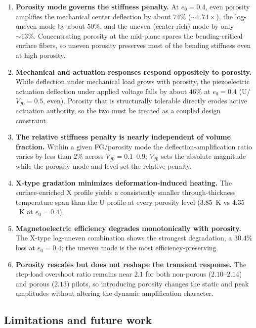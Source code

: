 \documentclass[11pt,a4paper]{article}
\begin{document}
\begin{enumerate}[leftmargin=2em]
\item \textbf{Porosity mode governs the stiffness penalty.} At $e_0 = 0.4$, even porosity amplifies the mechanical center deflection by about $74\%$ ($\sim1.74\times$), the log-uneven mode by about $50\%$, and the uneven (center-rich) mode by only $\sim13\%$. Concentrating porosity at the mid-plane spares the bending-critical surface fibers, so uneven porosity preserves most of the bending stiffness even at high porosity.

\item \textbf{Mechanical and actuation responses respond oppositely to porosity.} While deflection under mechanical load grows with porosity, the piezoelectric actuation deflection under applied voltage falls by about $46\%$ at $e_0=0.4$ (U/$V_{f0}=0.5$, even). Porosity that is structurally tolerable directly erodes active actuation authority, so the two must be treated as a coupled design constraint.

\item \textbf{The relative stiffness penalty is nearly independent of volume fraction.} Within a given FG/porosity mode the deflection-amplification ratio varies by less than $2\%$ across $V_{f0}=0.1$--$0.9$; $V_{f0}$ sets the absolute magnitude while the porosity mode and level set the relative penalty.

\item \textbf{X-type gradation minimizes deformation-induced heating.} The surface-enriched X profile yields a consistently smaller through-thickness temperature span than the U profile at every porosity level ($3.85$~K vs $4.35$~K at $e_0=0.4$).

\item \textbf{Magnetoelectric efficiency degrades monotonically with porosity.} The X-type log-uneven combination shows the strongest degradation, a $30.4\%$ loss at $e_0=0.4$; the uneven mode is the most efficiency-preserving.

\item \textbf{Porosity rescales but does not reshape the transient response.} The step-load overshoot ratio remains near $2.1$ for both non-porous ($2.10$--$2.14$) and porous ($2.13$) pilots, so introducing porosity changes the static and peak amplitudes without altering the dynamic amplification character.
\end{enumerate}

\subsection*{Limitations and future work}
\end{document}
